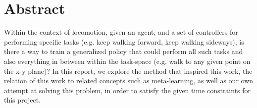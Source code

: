 \documentclass{article}
\begin{document}



\printAffiliationsAndNotice{}  %

\section{Abstract}
Within the context of locomotion, given an agent, and a set of controllers for performing specific tasks (e.g. keep walking forward, keep walking sideways), is there a way to train a generalized policy that could perform all such tasks and also everything in between within the task-space (e.g. walk to any given point on the x-y plane)? In this report, we explore the method that inspired this work, the relation of this work to related concepts such as meta-learning, as well as our own attempt at solving this problem, in order to satisfy the given time constraints for this project.
\end{document}
